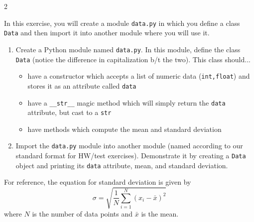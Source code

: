 \documentclass[12pt]{article}%
\newcommand{\code}[1]{\texttt{#1}}
\begin{document}
\begin{multicols*}{2}
\begin{Exercise}[origin={40 points}]

In this exercise, you will create a module \code{data.py} in which you define a class \code{Data} and then import it into another module where you will use it.

\begin{enumerate}
\item Create a Python module named \code{data.py}. In this module, define the class \code{Data} (notice the difference in capitalization b/t the two). This class should...
\begin{itemize}
	\item have a constructor which accepts a list of numeric data (\code{int,float}) and stores it as an attribute called \code{data}
	\item have a \code{\_\_str\_\_} magic method which will simply return the \code{data} attribute, but cast to a \code{str}
	\item have methods which compute the mean and standard deviation
\end{itemize}
\item Import the \code{data.py} module into another module (named according to our standard format for HW/test exercises). Demonstrate it by creating a \code{Data} object and printing its \code{data} attribute, mean, and standard deviation.
\end{enumerate}

For reference, the equation for standard deviation is given by
\begin{equation*}
\sigma = \sqrt{\frac{1}{N}\sum_{i=1}^{N}(x_i - \bar x)^2}
\end{equation*}
where $N$ is the number of data points and $\bar x$ is the mean. \\

\end{Exercise}





\end{multicols*}
\end{document}
